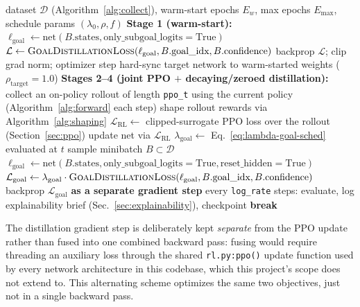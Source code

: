 \documentclass[11pt]{article}
\newcommand{\code}[1]{\texttt{#1}}
\begin{document}
\begin{algorithm}[H]
\caption{Full LLM-Distilled Training Procedure}
\label{alg:train}
\begin{algorithmic}[1]
\Require dataset $\mathcal{D}$ (Algorithm~\ref{alg:collect}), warm-start epochs $E_w$,
  max epochs $E_{\max}$, schedule params $(\lambda_0, \rho, f)$
\State \textbf{Stage 1 (warm-start):} 
    \State $\ell_{\text{goal}} \gets \text{net}(B.\text{states}, \text{only\_subgoal\_logits}{=}\text{True})$
    \State $\mathcal{L} \gets \textsc{GoalDistillationLoss}(\ell_{\text{goal}}, B.\text{goal\_idx}, B.\text{confidence})$
    \State backprop $\mathcal{L}$; clip grad norm; optimizer step
  \EndFor
\EndFor
\State hard-sync target network to warm-started weights ($\rho_{\text{target}}{=}1.0$)
\State \textbf{Stages 2--4 (joint PPO $+$ decaying/zeroed distillation):}
  \State collect an on-policy rollout of length \code{ppo\_t} using the current policy
    (Algorithm~\ref{alg:forward} each step)
  \If{\code{--llm\_shaping} enabled}
    \State shape rollout rewards via Algorithm~\ref{alg:shaping}
  \EndIf
  \State $\mathcal{L}_{\text{RL}} \gets$ clipped-surrogate PPO loss over the rollout (Section~\ref{sec:ppo})
  \State update net via $\mathcal{L}_{\text{RL}}$ 
  \State $\lambda_{\text{goal}} \gets$ Eq.~\ref{eq:lambda-goal-sched} evaluated at $t$
    \State sample minibatch $B \subset \mathcal{D}$
    \State $\ell_{\text{goal}} \gets \text{net}(B.\text{states}, \text{only\_subgoal\_logits}{=}\text{True}, \text{reset\_hidden}{=}\text{True})$
    \State $\mathcal{L}_{\text{goal}} \gets \lambda_{\text{goal}} \cdot \textsc{GoalDistillationLoss}(\ell_{\text{goal}}, B.\text{goal\_idx}, B.\text{confidence})$
    \State backprop $\mathcal{L}_{\text{goal}}$ \textbf{as a separate gradient step} 
  \EndIf
  \State every \code{log\_rate} steps: evaluate, log explainability brief (Sec.~\ref{sec:explainability}), checkpoint
  \If{$t / \code{log\_rate} \ge E_{\max}$} \textbf{break}
  \EndIf
\EndFor
\end{algorithmic}
\end{algorithm}

The distillation gradient step is deliberately kept \emph{separate} from the PPO
update rather than fused into one combined backward pass: fusing would require
threading an auxiliary loss through the shared \code{rl.py:ppo()} update function
used by every network architecture in this codebase, which this project's scope does
not extend to. This alternating scheme optimizes the same two objectives, just not in
a single backward pass.
\end{document}
